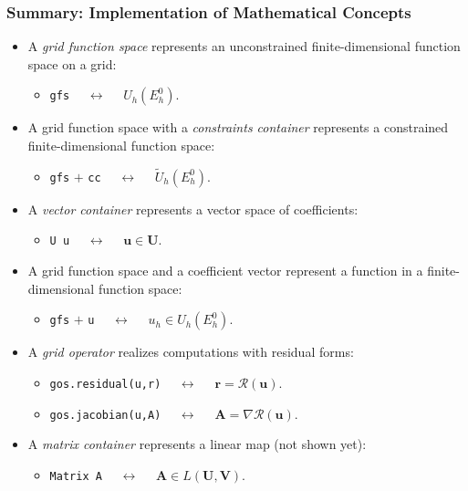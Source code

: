 \begin{frame}
\frametitle{Summary: Implementation of Mathematical Concepts}
\begin{itemize}
\item A \textit{grid function space} represents an unconstrained finite-dimensional
function space on a grid:
\begin{itemize}
\item \lstinline{gfs} $\quad\leftrightarrow\quad$ $U_h(E_h^0)$.
\end{itemize}
\item A grid function space with a \textit{constraints container} represents a constrained 
finite-dimensional function space:
\begin{itemize}
\item \lstinline{gfs} $+$ \lstinline{cc} $\quad\leftrightarrow\quad$ $\tilde{U}_h(E_h^0)$.
\end{itemize}
\item A \textit{vector container} represents a vector space of coefficients:
\begin{itemize}
\item \lstinline{U u} $\quad\leftrightarrow\quad$ $\mathbf{u}\in\mathbf{U}$.
\end{itemize}
\item A grid function space and a coefficient vector represent a function in a
finite-dimensional function space:
\begin{itemize}
\item \lstinline{gfs} $+$ \lstinline{u} $\quad\leftrightarrow\quad$ $u_h\in U_h(E_h^0)$.
\end{itemize}
\item A \textit{grid operator} realizes computations with residual forms:
\begin{itemize}
\item \lstinline{gos.residual(u,r)} $\quad\leftrightarrow\quad$ $\mathbf{r} = \mathcal{R}(\mathbf{u})$.
\item \lstinline{gos.jacobian(u,A)} $\quad\leftrightarrow\quad$ $\mathbf{A} = \nabla\mathcal{R}(\mathbf{u})$.
\end{itemize}
\item A \textit{matrix container} represents a linear map (not shown yet):
\begin{itemize}
\item \lstinline{Matrix A} $\quad\leftrightarrow\quad$ $\mathbf{A}\in L(\mathbf{U},\mathbf{V})$.
\end{itemize}
\end{itemize}
\end{frame}

